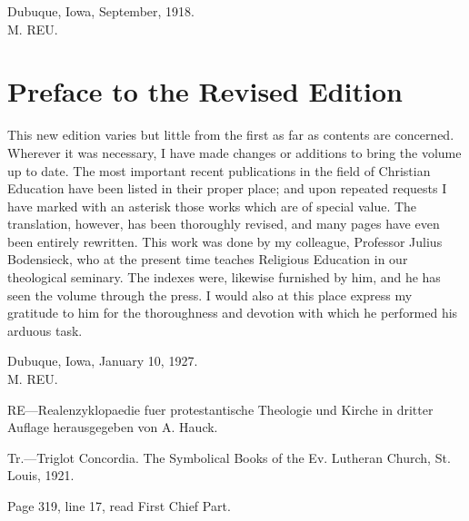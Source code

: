 \begin{unterschrift}
Dubuque, Iowa, September, 1918.\\
M. REU.
\end{unterschrift}

\chapter{Preface to the Revised Edition}
This new edition varies but little from the first as far as contents are concerned. Wherever it was necessary, I have made changes or additions to bring the volume up to date. The most important recent publications in the field of Christian Education have been listed in their proper place; and upon repeated requests I have marked with an asterisk those works which are of special value. The translation, however, has been thoroughly revised, and many pages have even been entirely rewritten. This work was done by my colleague, Professor Julius Bodensieck, who at the present time teaches Religious Education in our theological seminary. The indexes were, likewise furnished by him, and he has seen the volume through the press. I would also at this place express my gratitude to him for the thoroughness and devotion with which he performed his arduous task.

\begin{unterschrift}
Dubuque, Iowa, January 10, 1927.\\
M. REU.
\end{unterschrift}

RE—Realenzyklopaedie fuer protestantische Theologie und Kirche in dritter Auflage herausgegeben von A. Hauck.

Tr.—Triglot Concordia. The Symbolical Books of the Ev. Lutheran Church, St. Louis, 1921.

Page 319, line 17, read First Chief Part.

